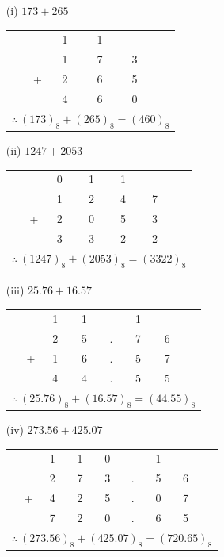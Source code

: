 \medskip
\begin{solution}
\begin{itemize}
\item[(i)] 
$173+265$

\begin{tabular}{rcccc}
 & {\footnotesize 1} & {\footnotesize 1} & &\\
 & 1 & 7 & 3&\\
+ & 2 & 6 & 5&\\
\cline{2-4}
 & 4 & 6 & 0&\\[10pt]
\multicolumn{5}{l}{$\therefore~(173)_{8}+(265)_{8}=(460)_{8}$}
\end{tabular}

\item[(ii)] 
$1247+2053$

\begin{tabular}{rccccc}
 & {\footnotesize 0} & {\footnotesize 1} & {\footnotesize 1} & &\\
 & 1 & 2 & 4 & 7 &\\
+ & 2 & 0 & 5 & 3 &\\
\cline{2-5}
 & 3 & 3 & 2 & 2 &\\[10pt]
\multicolumn{6}{l}{$\therefore~(1247)_{8}+(2053)_{8}=(3322)_{8}$}
\end{tabular}


\medskip

\item[(iii)] $25.76+16.57$

\begin{tabular}[t]{rcccccc}
 & {\footnotesize 1} & {\footnotesize 1} & & {\footnotesize 1} & &\\
 & 2 & 5 & . & 7 & 6 & \\
+ & 1 & 6 & . & 5 & 7 &\\
\cline{2-6}
 & 4 & 4 & . & 5 & 5 &\\[10pt]
\multicolumn{7}{l}{$\therefore~(25.76)_{8}+(16.57)_{8}=(44.55)_{8}$}
\end{tabular}

\item[(iv)]
$273.56+425.07$

\begin{tabular}[t]{rccccccc}
 & {\footnotesize 1} & {\footnotesize 1} & {\footnotesize 0} & & {\footnotesize 1} & &\\
 & 2 & 7 & 3 & . & 5 & 6 &\\
+ & 4 & 2 & 5 & . & 0 & 7\\
\cline{2-6}
 & 7 & 2 & 0 & . & 6 & 5 &\\[10pt]
\multicolumn{8}{l}{$\therefore~(273.56)_{8}+(425.07)_{8}=(720.65)_{8}$}
\end{tabular}


\end{itemize}
\end{solution}
